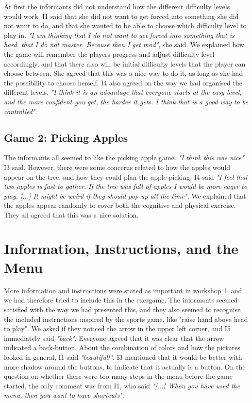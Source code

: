 At first the informants did not understand how the different difficulty levels would work. I1 said that she did not want to get forced into something she did not want to do, and that she wanted to be able to choose which difficulty level to play in. \emph{"I am thinking that I do not want to get forced into something that is hard, that I do not master. Because then I get mad"}, she said. We explained how the game will remember the players progress and adjust difficulty level accordingly, and that there also will be initial difficulty levels that the player can choose between. She agreed that this was a nice way to do it, as long as she had the possibility to choose herself. I4 also agreed on the way we had organised the different levels. \emph{"I think it is an advantage that everyone starts at the easy level, and the more confident you get, the harder it gets. I think that is a good way to be controlled"}.

\subsection{Game 2: Picking Apples}

The informants all seemed to like the picking apple game. \emph{"I think this was nice"} I3 said. However, there were some concerns related to how the apples would appear on the tree, and how they could plan the apple picking. I4 said \emph{"I feel that two apples is fast to gather. If the tree was full of apples I would be more eager to play. [...] It might be weird if they should pop up all the time"}. We explained that the apples appear randomly to cover both the cognitive and physical exercise. They all agreed that this was a nice solution. 


\section{Information, Instructions, and the Menu}

More information and instructions were stated as important in workshop 1, and we had therefore tried to include this in the exergame. The informants seemed satisfied with the way we had presented this, and they also seemed to recognise the included instructions inspired by the sports game, like "raise hand above head to play". We asked if they noticed the arrow in the upper left corner, and I5 immediately said \emph{"back"}. Everyone agreed that it was clear that the arrow indicated a back-button. About the combination of colors and how the pictures looked in general, I1 said \emph{"beautiful!"}. I3 mentioned that it would be better with more shadow around the buttons, to indicate that it actually is a button. On the question on whether there were too many steps in the menu before the game started, the only comment was from I1, who said \emph{"[...] When you have used the menu, then you want to have shortcuts"}. 

